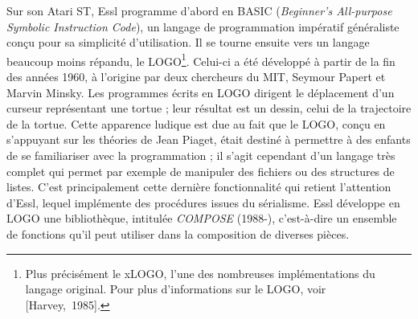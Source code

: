 \documentclass[a4paper,12pt]{article}
\newcommand{\cicite}[1]{{\footnotesize[#1]}}
\begin{document}
Sur son Atari ST, Essl programme d'abord en BASIC (\emph{Beginner's All-purpose Symbolic Instruction Code}), un langage de programmation impératif généraliste conçu pour sa simplicité d'utilisation. Il se tourne ensuite vers un langage beaucoup moins répandu, le LOGO\footnote{Plus précisément le xLOGO, l'une des nombreuses implémentations du langage original. Pour plus d'informations sur le LOGO, voir \cicite{Harvey,~1985}.}. Celui-ci a été développé à partir de la fin des années 1960, à l'origine par deux chercheurs du MIT, Seymour Papert et Marvin Minsky. Les programmes écrits en LOGO dirigent le déplacement d'un curseur représentant une tortue ; leur résultat est un dessin, celui de la trajectoire de la tortue. Cette apparence ludique est due au fait que le LOGO, conçu en s'appuyant sur les théories de Jean Piaget, était destiné à permettre à des enfants de se familiariser avec la programmation ; il s'agit cependant d'un langage très complet qui permet par exemple de manipuler des fichiers ou des structures de listes. C'est principalement cette dernière fonctionnalité qui retient l'attention d'Essl, lequel implémente des procédures issues du sérialisme. Essl développe en LOGO une bibliothèque, intitulée \emph{COMPOSE} (1988-), c'est-à-dire un ensemble de fonctions qu'il peut utiliser dans la composition de diverses pièces.
\end{document}
